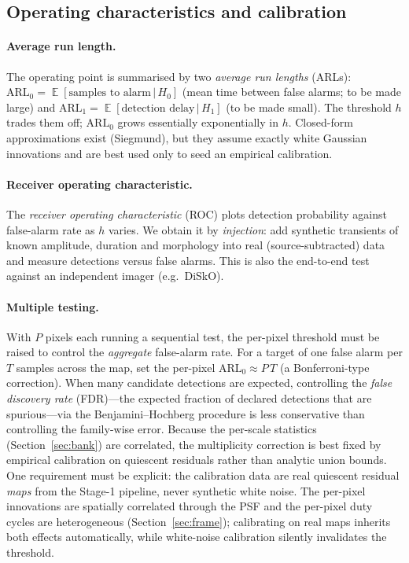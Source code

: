 \documentclass[11pt]{article}
\DeclareMathOperator{\E}{\mathbb{E}}
\newcommand{\given}{\,|\,}
\begin{document}
\subsection{Operating characteristics and calibration}
\label{sec:arl}

\paragraph{Average run length.}
The operating point is summarised by two \emph{average run lengths} (ARLs):
$\mathrm{ARL}_0=\E[\text{samples to alarm}\given H_0]$ (mean time between false alarms;
to be made large) and $\mathrm{ARL}_1=\E[\text{detection delay}\given H_1]$ (to be made
small). The threshold $h$ trades them off; $\mathrm{ARL}_0$ grows essentially
exponentially in $h$. Closed-form approximations exist (Siegmund), but they assume
exactly white Gaussian innovations and are best used only to seed an empirical
calibration.

\paragraph{Receiver operating characteristic.}
The \emph{receiver operating characteristic} (ROC) plots detection probability against
false-alarm rate as $h$ varies. We obtain it by \emph{injection}: add synthetic
transients of known amplitude, duration and morphology into real
(source-subtracted) data and measure detections versus false alarms. This is also the
end-to-end test against an independent imager (e.g.\ DiSkO).

\paragraph{Multiple testing.}
With $P$ pixels each running a sequential test, the per-pixel threshold must be raised
to control the \emph{aggregate} false-alarm rate. For a target of one false alarm per
$T$ samples across the map, set the per-pixel $\mathrm{ARL}_0\approx P\,T$ (a
Bonferroni-type correction). When many candidate detections are expected, controlling
the \emph{false discovery rate} (FDR)---the expected fraction of declared detections
that are spurious---via the Benjamini--Hochberg procedure is less conservative than
controlling the family-wise error. Because the per-scale statistics
(Section~\ref{sec:bank}) are correlated, the multiplicity correction is best fixed by
empirical calibration on quiescent residuals rather than analytic union bounds. One requirement
must be explicit: the calibration data are real quiescent residual \emph{maps} from the Stage-1
pipeline, never synthetic white noise. The per-pixel innovations are spatially correlated through
the PSF and the per-pixel duty cycles are heterogeneous (Section~\ref{sec:frame}); calibrating on
real maps inherits both effects automatically, while white-noise calibration silently invalidates
the threshold.
\end{document}
